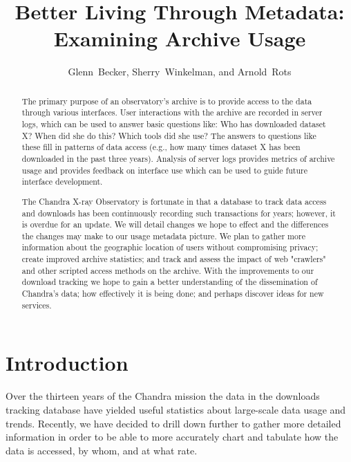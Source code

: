 
\resetcounters




\title{Better Living Through Metadata: Examining Archive Usage}
\author{Glenn~Becker, Sherry~Winkelman, and Arnold~Rots}


\begin{abstract}
The primary purpose of an observatory's archive is to provide access to the data through 
various interfaces. User interactions with the archive are recorded in server logs, which 
can be used to answer basic questions like: Who has downloaded dataset X? When did she 
do this? Which tools did she use? The answers to questions like these fill in patterns 
of data access (e.g., how many times dataset X has been downloaded in the past three years). 
Analysis of server logs provides metrics of archive usage and provides feedback on interface 
use which can be used to guide future interface development.

The Chandra X-ray Observatory is fortunate in that a database to track data access and 
downloads has been continuously recording such transactions for years; however, it is 
overdue for an update. We will detail changes we hope to effect and the differences 
the changes may make to our usage metadata picture. We plan to gather more information 
about the geographic location of users without compromising privacy; create improved 
archive statistics; and track and assess the impact of web "crawlers" and other scripted 
access methods on the archive. With the improvements to our download tracking we hope to 
gain a better understanding of the dissemination of Chandra's data; how effectively it 
is being done; and perhaps discover ideas for new services.
\end{abstract}

\section{Introduction}

Over the thirteen years of the Chandra mission the data in the downloads tracking database 
have yielded useful statistics about large-scale data usage and trends. Recently, we have
decided to drill down further to gather more detailed information in order to be able to 
more accurately chart and tabulate how the data is accessed, by whom, and at what rate.

